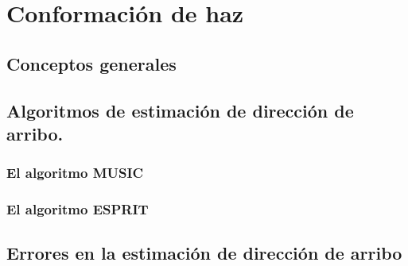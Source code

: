 \chapter{Conformación de haz}\label{ch:beamforming}

\section{Conceptos generales}\label{sec:beamforming_congen}

\section{Algoritmos de estimación de dirección de arribo.}\label{sec:beamforming_algoritmos}

\subsection{El algoritmo MUSIC}\label{sec:beamforming_MUSIC}

\subsection{El algoritmo ESPRIT}\label{sec:beamforming_ESPRIT}

\section{Errores en la estimación de dirección de arribo}\label{sec:beamforming_errores}


